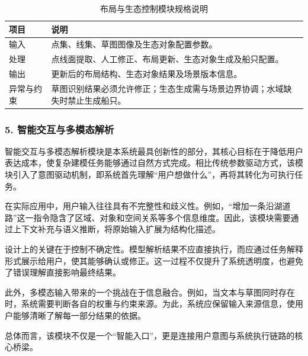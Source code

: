 \documentclass[UTF8,a4paper,10pt]{ctexart}
\begin{document}
{
\renewcommand{\arraystretch}{1.3}

\begin{table}[H]
\centering
\caption{布局与生态控制模块规格说明}

\begin{tabularx}{\textwidth}{p{2.6cm} Y}
\toprule
{}
\textbf{项目} & \textbf{说明} \\
\midrule

输入 & 点集、线集、草图图像及生态对象配置参数。 \\
处理 & 点线面提取、人工修正、布局更新、生态对象生成及船只配置。 \\
输出 & 更新后的布局结构、生态对象结果及场景版本信息。 \\
异常与约束 & 草图识别结果必须允许修正；生态生成需与场景边界协调；水域缺失时禁止生成船只。 \\

\bottomrule
\end{tabularx}
\end{table}
}

\subsubsection*{5. 智能交互与多模态解析}
智能交互与多模态解析模块是本系统最具创新性的部分，其核心目标在于降低用户表达成本，使复杂建模任务能够通过自然方式完成。相比传统参数驱动方式，该模块引入了意图驱动机制，即系统首先理解“用户想做什么”，再将其转化为可执行任务。

在实际应用中，用户输入往往具有不完整性和歧义性。例如，“增加一条沿湖道路”这一指令隐含了区域、对象和空间关系等多个信息维度。因此，该模块需要通过上下文补充与语义推断，将原始输入扩展为结构化描述。

设计上的关键在于控制不确定性。模型解析结果不应直接执行，而应通过任务解释形式展示给用户，使其能够确认或修正。这一过程不仅提升了系统透明度，也避免了错误理解直接影响最终结果。

此外，多模态输入带来的一个挑战在于信息融合。例如，当文本与草图同时存在时，系统需要判断各自的权重与约束来源。为此，系统应保留输入来源信息，使用户能够清晰了解每一部分结果的依据。

总体而言，该模块不仅是一个“智能入口”，更是连接用户意图与系统执行链路的核心桥梁。
\end{document}
